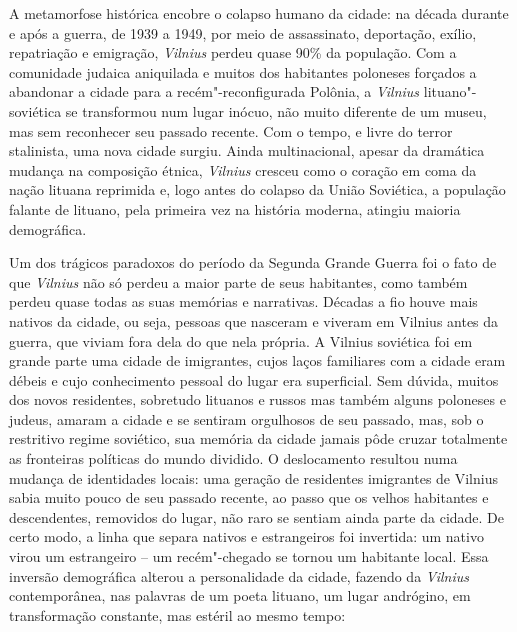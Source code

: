 A metamorfose histórica encobre o colapso humano da cidade: na década
durante e após a guerra, de 1939 a 1949, por meio de assassinato,
deportação, exílio, repatriação e emigração, \textit{Vilnius} perdeu quase
90\% da população. Com a comunidade judaica aniquilada e
muitos dos habitantes poloneses forçados a abandonar a cidade para a
recém"-reconfigurada Polônia, a \textit{Vilnius} lituano"-soviética se transformou
num lugar inócuo, não muito diferente de um museu, mas sem reconhecer
seu passado recente. Com o tempo, e livre do terror stalinista, uma nova
cidade surgiu. Ainda multinacional, apesar da dramática mudança na
composição étnica, \textit{Vilnius} cresceu como o coração em coma da nação
lituana reprimida e, logo antes do colapso da União Soviética, a
população falante de lituano, pela primeira vez na história moderna,
atingiu maioria demográfica.

Um dos trágicos paradoxos do período da Segunda Grande Guerra foi o fato
de que \textit{Vilnius} não só perdeu a maior parte de seus habitantes, como
também perdeu quase todas as suas memórias e narrativas. Décadas a fio
houve mais nativos da cidade, ou seja, pessoas que nasceram e viveram em
Vilnius antes da guerra, que viviam fora dela do que nela própria. A
Vilnius soviética foi em grande parte uma cidade de imigrantes, cujos
laços familiares com a cidade eram débeis e cujo conhecimento pessoal do
lugar era superficial. Sem dúvida, muitos dos novos residentes,
sobretudo lituanos e russos mas também alguns poloneses e judeus, amaram
a cidade e se sentiram orgulhosos de seu passado, mas, sob o restritivo
regime soviético, sua memória da cidade jamais pôde cruzar totalmente as
fronteiras políticas do mundo dividido. O deslocamento resultou numa
mudança de identidades locais: uma geração de residentes imigrantes de
Vilnius sabia muito pouco de seu passado recente, ao passo que os velhos
habitantes e descendentes, removidos do lugar, não raro se sentiam ainda
parte da cidade. De certo modo, a linha que separa nativos e
estrangeiros foi invertida: um nativo virou um estrangeiro -- um
recém"-chegado se tornou um habitante local. Essa inversão demográfica
alterou a personalidade da cidade, fazendo da \textit{Vilnius} contemporânea, nas
palavras de um poeta lituano, um lugar andrógino, em transformação
constante, mas estéril ao mesmo tempo:


